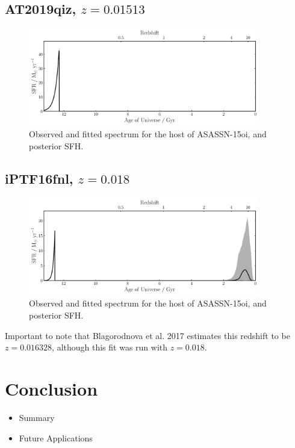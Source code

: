 \documentclass[a4paper,11pt]{article}
\begin{document}
\newpage
\subsection{AT2019qiz, $z=0.01513$}\label{sec:AT2019qiz}
\begin{figure}[h!]
\centering
  \includegraphics[width=0.9\textwidth]{../pipes/plots/r4_dblplaw_burst/AT2019qiz_sfh.pdf}
  \caption{Observed and fitted spectrum for the host of ASASSN-15oi, and posterior SFH.}
  \label{}
\end{figure}


\newpage
\subsection{iPTF16fnl, $z=0.018$}\label{sec:iPTF16fnl}
\begin{figure}[h!]
\centering
  \includegraphics[width=0.9\textwidth]{../pipes/plots/r4_dblplaw_burst/iPTF16fnl_sfh.pdf}
  \caption{Observed and fitted spectrum for the host of ASASSN-15oi, and posterior SFH.}
  \label{}
\end{figure}

Important to note that Blagorodnova et al. 2017 estimates this redshift to be $z=0.016328$, although this fit was run with $z=0.018$.\cite{Blagorodnova_2017}

\section{Conclusion}\label{sec:conclusion}
\begin{itemize}
  \item Summary
  \item Future Applications
\end{itemize}
\end{document}
